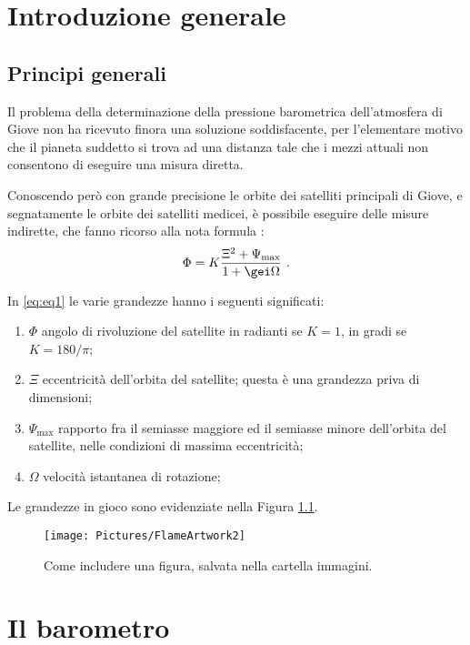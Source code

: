 \chapter{Introduzione generale}

\section{Principi generali}
Il problema della determinazione della pressione barometrica dell'atmosfera di Giove non ha ricevuto finora una soluzione soddisfacente, per l'elementare motivo che il pianeta suddetto si trova ad una distanza tale che i mezzi attuali non consentono di eseguire una misura diretta.

Conoscendo per\`o con grande precisione le orbite dei satelliti principali di Giove, e segnatamente le orbite dei satelliti medicei, \`e possibile eseguire delle misure indirette, che fanno ricorso alla nota formula \cite{gal}:
\begin{equation} \label{eq:eq1}
\Phi = K\frac{\Xi^2 +\Psi_\mathrm{max}}{1+\gei\Omega}\ .
\end{equation}

In \eqref{eq:eq1} le varie grandezze hanno i seguenti significati:
\begin{enumerate}
\item $\Phi$ angolo di rivoluzione del satellite in radianti se $K=1$, in gradi se $K=180/\pi$;
\item $\Xi$ eccentricit\`a dell'orbita del satellite; questa \`e una grandezza priva di dimensioni;
\item $\Psi_\mathrm{max}$ rapporto fra il semiasse maggiore ed il semiasse minore dell'orbita del satellite, nelle condizioni di massima eccentricit\`a;
\item $\Omega$ velocit\`a istantanea di rotazione; 
\end{enumerate}

Le grandezze in gioco sono evidenziate nella Figura \ref{fig:figura}.
\begin{figure}[htb]\centering
\texttt{[image: Pictures/FlameArtwork2]}
\caption{Come includere una figura, salvata nella cartella immagini.}\label{fig:figura}
\end{figure}




\chapter{Il barometro}
